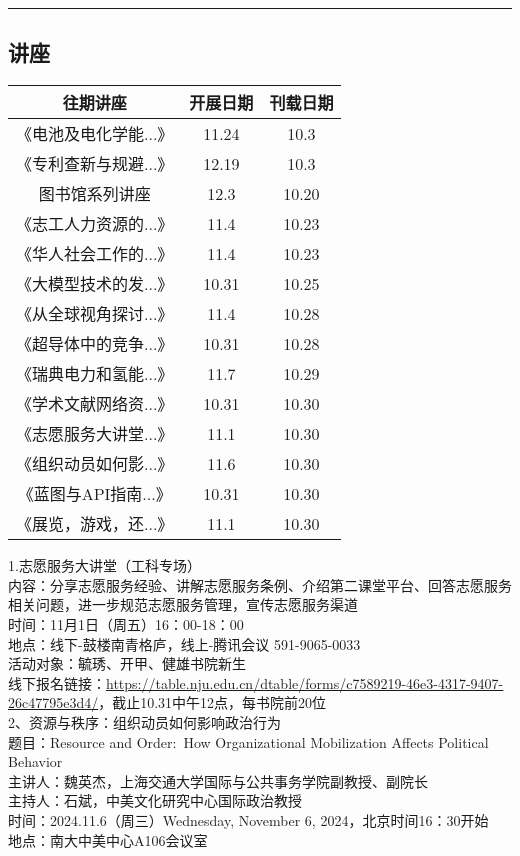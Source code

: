 \documentclass[letterpaper, 12pt]{article}
\begin{document}
\hrule
\pagebreak
\begin{multicols}{2}

\section{讲座}
\begin{tabular}{|c|c|c|}
    \hline
    往期讲座 & 开展日期 & 刊载日期\\
    \hline\hline
    《电池及电化学能...》 & 11.24 & 10.3\\
    《专利查新与规避...》 & 12.19 & 10.3\\
    图书馆系列讲座 & 12.3 & 10.20\\
    《志工人力资源的...》 & 11.4 & 10.23\\
    《华人社会工作的...》 & 11.4 & 10.23\\
    《大模型技术的发...》 & 10.31 & 10.25\\
    《从全球视角探讨...》 & 11.4 & 10.28\\
    《超导体中的竞争...》 & 10.31 & 10.28\\
    《瑞典电力和氢能...》 & 11.7 & 10.29\\
    《学术文献网络资...》 & 10.31 & 10.30\\
    《志愿服务大讲堂...》 & 11.1 & 10.30\\
    《组织动员如何影...》 & 11.6 & 10.30\\
    《蓝图与API指南...》 & 10.31 & 10.30\\
    《展览，游戏，还...》 & 11.1 & 10.30\\
    
    \hline
\end{tabular}

1.志愿服务大讲堂（工科专场）\\
内容：分享志愿服务经验、讲解志愿服务条例、介绍第二课堂平台、回答志愿服务相关问题，进一步规范志愿服务管理，宣传志愿服务渠道\\
时间：11月1日（周五）16：00-18：00\\
地点：线下-鼓楼南青格庐，线上-腾讯会议 591-9065-0033\\
活动对象：毓琇、开甲、健雄书院新生\\
线下报名链接：\url{https://table.nju.edu.cn/dtable/forms/c7589219-46e3-4317-9407-26c47795e3d4/}，截止10.31中午12点，每书院前20位\\

2、资源与秩序：组织动员如何影响政治行为\\
题目：Resource and Order: How Organizational Mobilization Affects Political Behavior\\
主讲人：魏英杰，上海交通大学国际与公共事务学院副教授、副院长\\
主持人：石斌，中美文化研究中心国际政治教授\\
时间：2024.11.6（周三）Wednesday, November 6, 2024，北京时间16：30开始\\
地点：南大中美中心A106会议室\\


\end{multicols}
\end{document}
